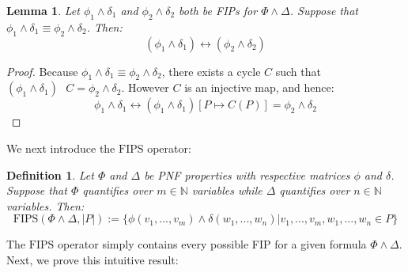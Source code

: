 \documentclass[12pt]{article}
\newtheorem{lemma}{Lemma}
\newtheorem{definition}{Definition}
\newcommand{\msp}{\text{ }}
\newcommand{\fips}{\text{FIPS}}
\begin{document}
\begin{lemma}
  Let $\phi_1\land\delta_1$ and $\phi_2\land\delta_2$ both be FIPs for $\Phi\land\Delta$.  Suppose that $\phi_1\land\delta_1 \equiv \phi_2\land\delta_2$.  Then:
  $$(\phi_1 \land \delta_1) \leftrightarrow (\phi_2 \land \delta_2)$$
\end{lemma}
\begin{proof}
  Because $\phi_1\land\delta_1 \equiv \phi_2\land\delta_2$, there exists a cycle $C$ such that $(\phi_1\land\delta_1) \msp C = \phi_2\land\delta_2$.  However $C$ is an injective map, and hence:
  $$\phi_1\land\delta_1 \leftrightarrow (\phi_1\land\delta_1)[P \mapsto C(P)] = \phi_2\land\delta_2$$
\end{proof}

We next introduce the $\fips$ operator:
\begin{definition}
  Let $\Phi$ and $\Delta$ be PNF properties with respective matrices $\phi$ and $\delta$.  Suppose that $\Phi$ quantifies over $m \in \mathbb{N}$ variables while $\Delta$ quantifies over $n \in \mathbb{N}$ variables.  Then:
  $$\fips(\Phi \land \Delta, |P|) := \{\phi(v_1,...,v_m) \land \delta(w_1,...,w_n) | v_1,...,v_m,w_1,...,w_n \in P\}$$
\end{definition}

The $\fips$ operator simply contains every possible FIP for a given formula $\Phi \land \Delta$.  Next, we prove this intuitive result:
\end{document}
